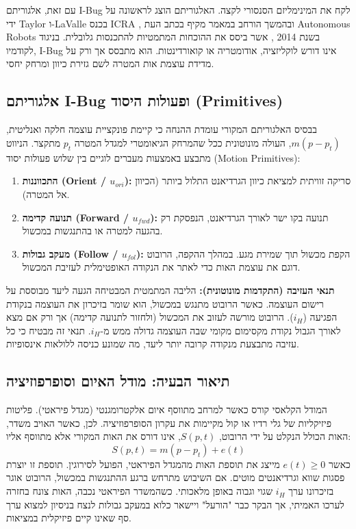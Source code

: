 \documentclass[12pt, a4paper]{article}
\begin{document}
עם זאת, אלגוריתם \textenglish{I-Bug} לקח את המינימליזם הסנסורי לקצה. האלגוריתם הוצג לראשונה על ידי \textenglish{Taylor} ו-\textenglish{LaValle} בכנס \textenglish{ICRA} \cite{taylor2011ibug}, ובהמשך הורחב במאמר מקיף בכתב העת \textenglish{Autonomous Robots} בשנת 2014 \cite{taylor2014intensity}, אשר ביסס את ההוכחות המתמטיות להתכנסות גלובלית. בניגוד לקודמיו, \textenglish{I-Bug} אינו דורש לוקליזציה, אודומטריה או קואורדינטות. הוא מתבסס אך ורק על מדידת עוצמת אות המטרה לשם גזירת כיוון ומרחק יחסי.

\subsection{אלגוריתם \textenglish{I-Bug} ופעולות היסוד (\textenglish{Primitives})}
בבסיס האלגוריתם המקורי עומדת ההנחה כי קיימת פונקציית עוצמה חלקה ואנליטית, $m(p - p_t)$, העולה מונוטונית ככל שהמרחק הגיאומטרי למגדל המטרה $p_t$ מתקצר. הניווט מתבצע באמצעות מעברים לוגיים בין שלוש פעולות יסוד (\textenglish{Motion Primitives}):
\begin{enumerate}
    \item \textbf{התכווננות (\textenglish{Orient / $u_{ori}$}):} סריקה זוויתית למציאת כיוון הגרדיאנט התלול ביותר (הכיוון אל המטרה).
    \item \textbf{תנועה קדימה (\textenglish{Forward / $u_{fwd}$}):} תנועה בקו ישר לאורך הגרדיאנט, הנפסקת רק בהגעה למטרה או בהתנגשות במכשול.
    \item \textbf{מעקב גבולות (\textenglish{Follow / $u_{fol}$}):} הקפת מכשול תוך שמירת מגע. במהלך ההקפה, הרובוט דוגם את עוצמת האות כדי לאתר את הנקודה האופטימלית לעזיבת המכשול.
\end{enumerate}

\textbf{תנאי העזיבה (התקדמות מונוטונית):} 
הליבה המתמטית המבטיחה הגעה ליעד מבוססת על רישום העוצמה. כאשר הרובוט מתנגש במכשול, הוא שומר בזיכרון את העוצמה בנקודת הפגיעה ($i_H$). הרובוט מורשה לעזוב את המכשול (ולחזור לתנועה קדימה) אך ורק אם מצא לאורך הגבול נקודת מקסימום מקומי שבה העוצמה גדולה ממש מ-$i_H$. תנאי זה מבטיח כי כל עזיבה מתבצעת מנקודה קרובה יותר ליעד, מה שמונע כניסה ללולאות אינסופיות.

\subsection{תיאור הבעיה: מודל האיום וסופרפוזיציה}
המודל הקלאסי קורס כאשר למרחב מתווסף איום אלקטרומגנטי (מגדל פיראטי). פליטות פיזיקליות של גלי רדיו או קול מקיימות את עקרון הסופרפוזיציה. לכן, כאשר האויב משדר, האות הכולל הנקלט על ידי הרובוט, $S(p, t)$, אינו דורס את האות המקורי אלא מתווסף אליו:
\begin{equation}
S(p, t) = m(p - p_t) + e(t)
\end{equation}
כאשר $e(t) \ge 0$ מייצג את תוספת האות מהמגדל הפיראטי, הפועל לסירוגין. תוספת זו יוצרת פסגות שווא וגרדיאנטים מוטים. אם השיבוש מתרחש ברגע ההתנגשות במכשול, הרובוט אוגר בזיכרונו ערך $i_H$ שגוי וגבוה באופן מלאכותי. כשהמשדר הפיראטי נכבה, האות צונח בחזרה לערכו האמיתי, אך הבקר כבר "הורעל" ויישאר כלוא במעקב גבולות לנצח בניסיון למצוא ערך סף שאינו קיים פיזיקלית במציאות.
\end{document}
